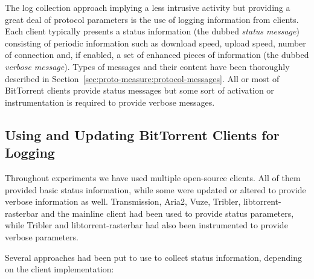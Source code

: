 The log collection approach implying a less intrusive activity but providing a
great deal of protocol parameters is the use of logging information from
clients. Each client typically presents a status information (the dubbed
\textit{status message}) consisting of periodic information such as download
speed, upload speed, number of connection and, if enabled, a set of enhanced
pieces of information (the dubbed \textit{verbose message}). Types of messages
and their content have been thoroughly described in
Section~\ref{sec:proto-measure:protocol-messages}. All or most of BitTorrent
clients provide status messages but some sort of activation or instrumentation
is required to provide verbose messages.

\subsection{Using and Updating BitTorrent Clients for Logging}

Throughout experiments we have used multiple open-source clients. All of them
provided basic status information, while some were updated or altered to
provide verbose information as well. Transmission, Aria2, Vuze, Tribler,
libtorrent-rasterbar and the mainline client had been used to provide status
parameters, while Tribler and libtorrent-rasterbar had also been instrumented
to provide verbose parameters.

Several approaches had been put to use to collect status information,
depending on the client implementation:

